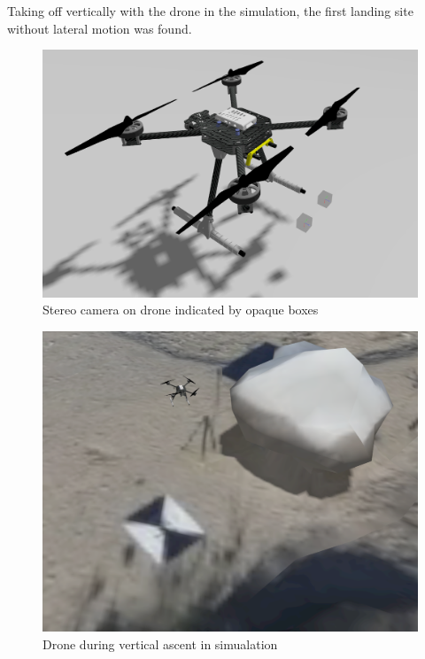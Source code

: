 Taking off vertically with the drone in the simulation, the first landing site without lateral motion was found.

\begin{figure}
    \centering
    \includegraphics[scale=0.32]{images/preparation/stereo/drone_with_stereo_cam.png}
    \caption{Stereo camera on drone indicated by opaque boxes}
\end{figure}

\begin{figure}
    \centering
    \includegraphics[scale=0.34]{images/preparation/stereo/ascent_sim.png}
    \caption{Drone during vertical ascent in simualation}
\end{figure}

